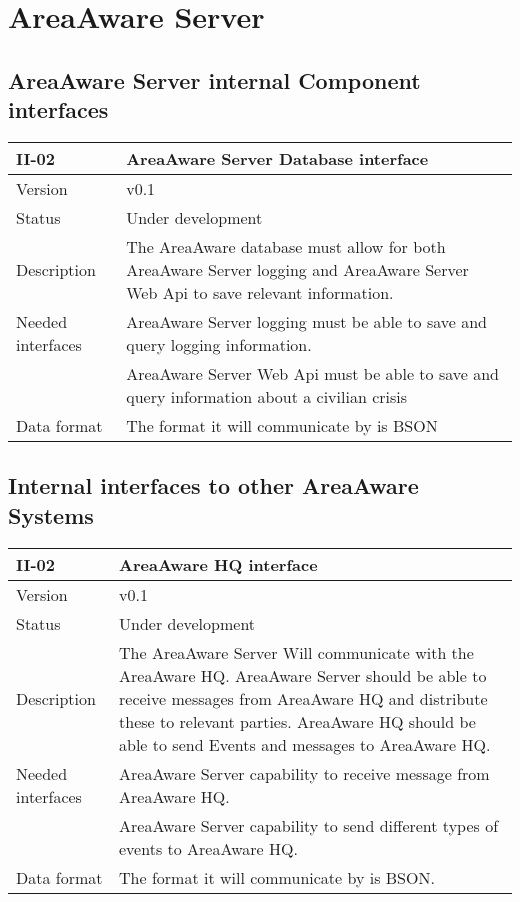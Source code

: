 \newpage

\section{AreaAware Server}
\label{sec:areaAwareserver}

\subsection{AreaAware Server internal Component interfaces}


\begin{longtable}{| p{3.5cm} |  p{10cm} | }
	\hline
	\textbf{II-02} &  \textbf{AreaAware Server Database interface } \\
	\hline
	Version & v0.1 \\
	\hline
	Status & Under development \\
	\hline
	Description & The AreaAware database must allow for both AreaAware Server logging and AreaAware Server Web Api to save relevant information.\\
	\hline
	Needed interfaces & AreaAware Server logging must be able to save and query logging information.\\
	& AreaAware Server Web Api must be able to save and query  information about a civilian crisis \\
	\hline
	Data format
	& The format it will communicate by is BSON \\
	\hline
\end{longtable}

\subsection{Internal interfaces to other AreaAware Systems}
\begin{longtable}{| p{3.5cm} |  p{10cm} | }
	\hline
	\textbf{II-02} &  \textbf{AreaAware HQ interface } \\
	\hline
	Version & v0.1 \\
	\hline
	Status & Under development \\
	\hline
	Description & The AreaAware Server Will communicate with the AreaAware HQ. AreaAware Server should be able to receive messages from AreaAware HQ and distribute these to relevant parties. AreaAware HQ should be able to send Events and messages to AreaAware HQ.\\
	\hline
	Needed interfaces & AreaAware Server capability to receive message from AreaAware HQ.\\
	& AreaAware Server capability to send different types of events to AreaAware HQ.\\
	\hline
	Data format
	& The format it will communicate by is BSON. \\
	\hline
\end{longtable}

